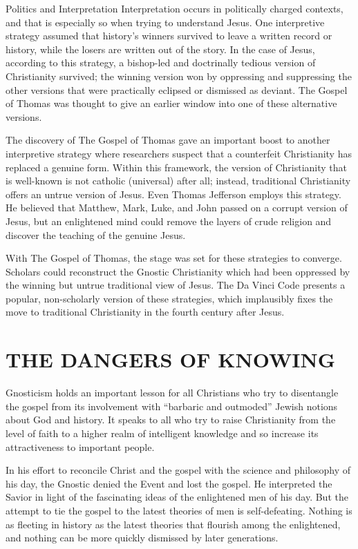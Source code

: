 \begin{sidebar}{Politics and Interpretation}
Interpretation occurs in politically charged contexts, and that is especially so when trying to
understand Jesus. One interpretive strategy assumed that history’s winners survived to leave a
written record or history, while the losers are written out of the story. In the case of Jesus,
according to this strategy, a bishop-led and doctrinally tedious version of Christianity survived;
the winning version won by oppressing and suppressing the other versions that were practically
eclipsed or dismissed as deviant. The Gospel of Thomas was thought to give an earlier window into
one of these alternative versions.

The discovery of The Gospel of Thomas gave an important boost to another interpretive strategy where
researchers suspect that a counterfeit Christianity has replaced a genuine form. Within this
framework, the version of Christianity that is well-known is not catholic (universal) after all;
instead, traditional Christianity offers an untrue version of Jesus. Even Thomas Jefferson employs
this strategy. He believed that Matthew, Mark, Luke, and John passed on a corrupt version of Jesus,
but an enlightened mind could remove the layers of crude religion and discover the teaching of the
genuine Jesus.

With The Gospel of Thomas, the stage was set for these strategies to converge. Scholars could
reconstruct the Gnostic Christianity which had been oppressed by the winning but untrue traditional
view of Jesus. The Da Vinci Code presents a popular, non-scholarly version of these strategies,
which implausibly fixes the move to traditional Christianity in the fourth century after Jesus.
\end{sidebar}

\section{THE DANGERS OF KNOWING}

Gnosticism holds an important lesson for all Christians who try to disentangle the gospel from its
involvement with “barbaric and outmoded” Jewish notions about God and history. It speaks to all who
try to raise Christianity from the level of faith to a higher realm of intelligent knowledge and so
increase its attractiveness to important people.

In his effort to reconcile Christ and the gospel with the science and philosophy of his day, the
Gnostic denied the Event and lost the gospel. He interpreted the Savior in light of the fascinating
ideas of the enlightened men of his day. But the attempt to tie the gospel to the latest theories of
men is self-defeating. Nothing is as fleeting in history as the latest theories that flourish among
the enlightened, and nothing can be more quickly dismissed by later generations.

